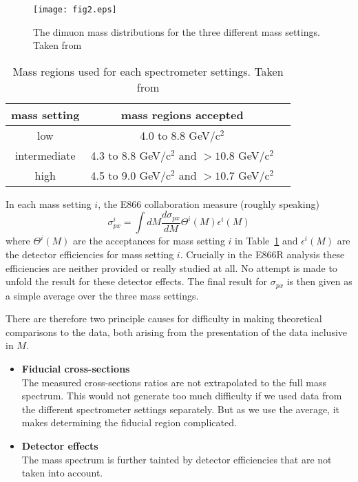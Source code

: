 \documentclass[11pt]{article}
\newcommand{\be}{\begin{equation}}
\newcommand{\ee}{\end{equation}}
\begin{document}
\begin{figure}[!h]
  \begin{center}
  \texttt{[image: fig2.eps]}
    \vspace*{-0.05in}                                
  \end{center}       
  \caption{The dimuon mass distributions for the three different mass settings. Taken from \cite{Towell:2001nh}}
  \label{fig:3mass}                    
\end{figure}      


\begin{table}[!h]
\begin{center}                                                          
\begin{tabular}{ccc}               
 mass setting	 & mass regions accepted    \\ \hline
 low	      & 4.0 to 8.8 \rm{GeV/c$^2$}   \\ 
 intermediate         & 4.3 to 8.8 \rm{GeV/c$^2$} and $> 10.8$ \rm{GeV/c$^2$}   \\
 high  	      & 4.5 to 9.0 \rm{GeV/c$^2$} and $> 10.7$ \rm{GeV/c$^2$} \\
\end{tabular}
\caption{Mass regions used for each spectrometer settings. Taken from \cite{Towell:2001nh}}
\label{tab:massregions}   
\end{center}
\end{table}

In each mass setting $i$, the E866 collaboration measure (roughly speaking)
\be \sigma^i_{px} = \int dM \frac{d\sigma_{px}}{dM} \Theta^i(M)\epsilon^i(M) \ee
where $\Theta^i(M)$ are the acceptances for mass setting $i$ in Table~\ref{tab:massregions} and
$\epsilon^i(M)$ are the detector efficiencies for mass setting $i$. Crucially in the E866R analysis
these efficiencies are neither provided or really studied at all. No attempt is made to unfold the result for
these detector effects. The final result for $\sigma_{px}$ is then given as a simple average over
the three mass settings.

There are therefore two principle causes for difficulty in making theoretical comparisons to the data, both arising from the presentation of the data inclusive in $M$.
\begin{itemize}
	\item \textbf{Fiducial cross-sections} \\
		The measured cross-sections ratios are not extrapolated to the full mass spectrum.
		This would not generate too much difficulty if we used data from the different spectrometer
		settings separately. But as we use the average, it makes determining the fiducial region complicated.
	\item \textbf{Detector effects} \\
		The mass spectrum is further tainted by detector efficiencies that are not taken into account.
\end{itemize}
\end{document}
